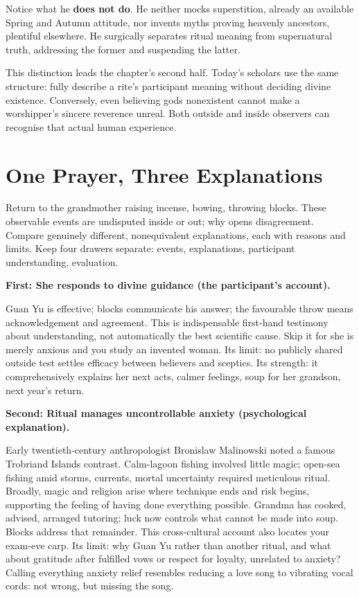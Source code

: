 Notice what he \textbf{does not do}. He neither mocks superstition, already an available Spring and Autumn attitude, nor invents myths proving heavenly ancestors, plentiful elsewhere. He surgically separates ritual meaning from supernatural truth, addressing the former and suspending the latter.

This distinction leads the chapter's second half. Today's scholars use the same structure: fully describe a rite's participant meaning without deciding divine existence. Conversely, even believing gods nonexistent cannot make a worshipper's sincere reverence unreal. Both outside and inside observers can recognise that actual human experience.

\section{One Prayer, Three Explanations}
Return to the grandmother raising incense, bowing, throwing blocks. These observable events are undisputed inside or out; why opens disagreement. Compare genuinely different, nonequivalent explanations, each with reasons and limits. Keep four drawers separate: events, explanations, participant understanding, evaluation.

\textbf{First: She responds to divine guidance (the participant's account).}

Guan Yu is effective; blocks communicate his answer; the favourable throw means acknowledgement and agreement. This is indispensable first-hand testimony about understanding, not automatically the best scientific cause. Skip it for she is merely anxious and you study an invented woman. Its limit: no publicly shared outside test settles efficacy between believers and sceptics. Its strength: it comprehensively explains her next acts, calmer feelings, soup for her grandson, next year's return.

\textbf{Second: Ritual manages uncontrollable anxiety (psychological explanation).}

Early twentieth-century anthropologist Bronislaw Malinowski noted a famous Trobriand Islands contrast. Calm-lagoon fishing involved little magic; open-sea fishing amid storms, currents, mortal uncertainty required meticulous ritual. Broadly, magic and religion arise where technique ends and risk begins, supporting the feeling of having done everything possible. Grandma has cooked, advised, arranged tutoring; luck now controls what cannot be made into soup. Blocks address that remainder. This cross-cultural account also locates your exam-eve carp. Its limit: why Guan Yu rather than another ritual, and what about gratitude after fulfilled vows or respect for loyalty, unrelated to anxiety? Calling everything anxiety relief resembles reducing a love song to vibrating vocal cords: not wrong, but missing the song.


